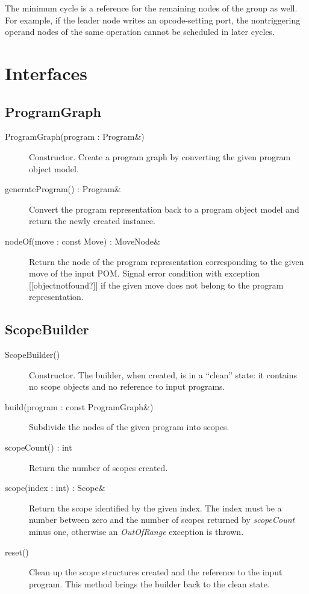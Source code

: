 \documentclass[a4paper,twoside]{tce}
\begin{document}
The minimum cycle is a reference for the remaining nodes of the
group as well. For example, if the leader node writes an opcode-setting port,
the nontriggering operand nodes of the same operation cannot be scheduled in
later cycles.

\section{Interfaces}

\subsection{ProgramGraph}

\begin{description}
\item[ProgramGraph(program : Program\&)]%
  Constructor. Create a program graph by converting the given program object
  model.
\item[generateProgram() : Program\&]%
  Convert the program representation back to a program object model and
  return the newly created instance.
\item[nodeOf(move : const Move) : MoveNode\&]%
  Return the node of the program representation corresponding to the given
  move of the input POM. Signal error condition with exception
  [[objectnotfound?]] if the given move does not belong to the program
  representation.
\end{description}

\subsection{ScopeBuilder}

\begin{description}
\item[ScopeBuilder()]%
  Constructor. The builder, when created, is in a ``clean'' state: it
  contains no scope objects and no reference to input programs.
\item[build(program : const ProgramGraph\&)]%
  Subdivide the nodes of the given program into scopes.
\item[scopeCount() : int]%
  Return the number of scopes created.
\item[scope(index : int) : Scope\&]%
  Return the scope identified by the given index. The index must be a number
  between zero and the number of scopes returned by \emph{scopeCount} minus
  one, otherwise an \emph{OutOfRange} exception is thrown.
\item[reset()]%
  Clean up the scope structures created and the reference to the input
  program. This method brings the builder back to the clean state.
\end{description}
\end{document}
